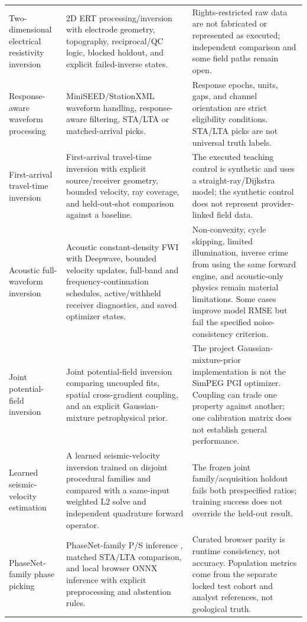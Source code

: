 \begin{center}
\begin{longtable}{@{}>{\raggedright\arraybackslash}p{}>{\raggedright\arraybackslash}p{}>{\raggedright\arraybackslash}p{}@{}}
Two-dimensional electrical resistivity inversion & 2D ERT processing/inversion with electrode geometry, topography, reciprocal/QC logic, blocked holdout, and explicit failed-inverse states. & Rights-restricted raw data are not fabricated or represented as executed; independent comparison and some field paths remain open. \\
Response-aware waveform processing & MiniSEED/StationXML waveform handling, response-aware filtering, STA/LTA or matched-arrival picks. & Response epochs, units, gaps, and channel orientation are strict eligibility conditions. STA/LTA picks are not universal truth labels. \\
First-arrival travel-time inversion & First-arrival travel-time inversion with explicit source/receiver geometry, bounded velocity, ray coverage, and held-out-shot comparison against a baseline. & The executed teaching control is synthetic and uses a straight-ray/Dijkstra model; the synthetic control does not represent provider-linked field data. \\
Acoustic full-waveform inversion & Acoustic constant-density FWI with Deepwave, bounded velocity updates, full-band and frequency-continuation schedules, active/withheld receiver diagnostics, and saved optimizer states. & Non-convexity, cycle skipping, limited illumination, inverse crime from using the same forward engine, and acoustic-only physics remain material limitations. Some cases improve model RMSE but fail the specified noise-consistency criterion. \\
Joint potential-field inversion & Joint potential-field inversion comparing uncoupled fits, spatial cross-gradient coupling, and an explicit Gaussian-mixture petrophysical prior. & The project Gaussian-mixture-prior implementation is not the SimPEG PGI optimizer. Coupling can trade one property against another; one calibration matrix does not establish general performance. \\
Learned seismic-velocity estimation & A learned seismic-velocity inversion trained on disjoint procedural families and compared with a same-input weighted L2 solve and independent quadrature forward operator. & The frozen joint family/acquisition holdout fails both prespecified ratios; training success does not override the held-out result. \\
PhaseNet-family phase picking & PhaseNet-family P/S inference \cite{zhu2019}, matched STA/LTA comparison, and local browser ONNX inference with explicit preprocessing and abstention rules. & Curated browser parity is runtime consistency, not accuracy. Population metrics come from the separate locked test cohort and analyst references, not geological truth. \\

\end{longtable}
\end{center}
